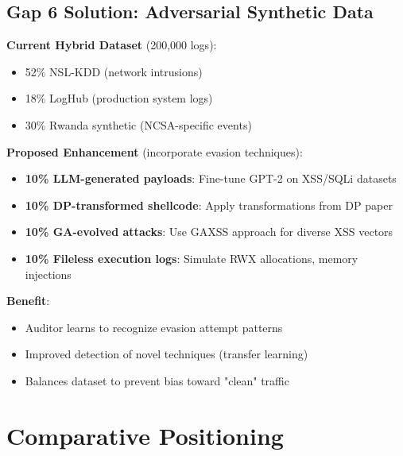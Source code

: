 \documentclass[11pt,conference]{IEEEtran}
\begin{document}
\subsection{Gap 6 Solution: Adversarial Synthetic Data}

\textbf{Current Hybrid Dataset} (200,000 logs):
\begin{itemize}
    \item 52\% NSL-KDD (network intrusions)
    \item 18\% LogHub (production system logs)
    \item 30\% Rwanda synthetic (NCSA-specific events)
\end{itemize}

\textbf{Proposed Enhancement} (incorporate evasion techniques):
\begin{itemize}
    \item \textbf{10\% LLM-generated payloads}: Fine-tune GPT-2 on XSS/SQLi datasets
    \item \textbf{10\% DP-transformed shellcode}: Apply transformations from DP paper
    \item \textbf{10\% GA-evolved attacks}: Use GAXSS approach for diverse XSS vectors
    \item \textbf{10\% Fileless execution logs}: Simulate RWX allocations, memory injections
\end{itemize}

\textbf{Benefit}:
\begin{itemize}
    \item Auditor learns to recognize evasion attempt patterns
    \item Improved detection of novel techniques (transfer learning)
    \item Balances dataset to prevent bias toward "clean" traffic
\end{itemize}

\section{Comparative Positioning}
\end{document}

